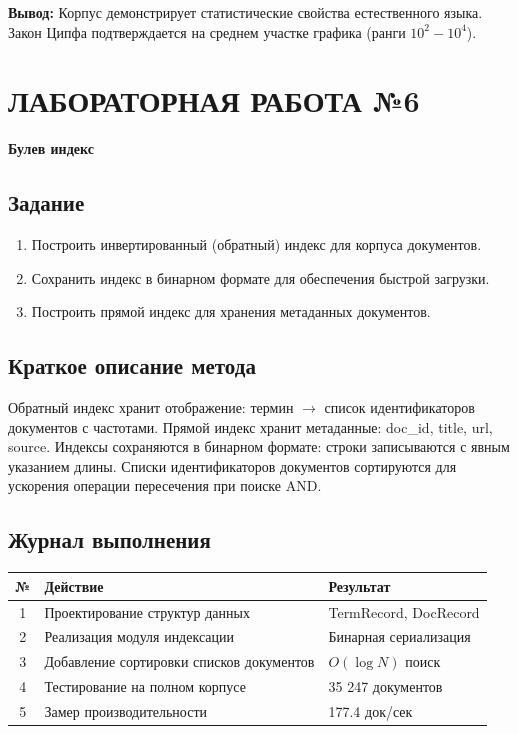 \documentclass[a4paper, 12pt]{article}
\begin{document}
\textbf{Вывод:} Корпус демонстрирует статистические свойства естественного языка. Закон Ципфа подтверждается на среднем участке графика (ранги $10^2 - 10^4$).

\newpage

\section*{ЛАБОРАТОРНАЯ РАБОТА №6}
\textbf{Булев индекс}

\subsection*{Задание}
\begin{enumerate}
    \item Построить инвертированный (обратный) индекс для корпуса документов.
    \item Сохранить индекс в бинарном формате для обеспечения быстрой загрузки.
    \item Построить прямой индекс для хранения метаданных документов.
\end{enumerate}

\subsection*{Краткое описание метода}
Обратный индекс хранит отображение: термин $\rightarrow$ список идентификаторов документов с частотами. Прямой индекс хранит метаданные: doc\_id, title, url, source. Индексы сохраняются в бинарном формате: строки записываются с явным указанием длины. Списки идентификаторов документов сортируются для ускорения операции пересечения при поиске AND.

\subsection*{Журнал выполнения}
\begin{table}[h]
\centering
\begin{tabular}{|c|l|l|}
\hline
\textbf{№} & \textbf{Действие} & \textbf{Результат} \\ \hline
1 & Проектирование структур данных & TermRecord, DocRecord \\ \hline
2 & Реализация модуля индексации & Бинарная сериализация \\ \hline
3 & Добавление сортировки списков документов & $O(\log N)$ поиск \\ \hline
4 & Тестирование на полном корпусе & 35 247 документов \\ \hline
5 & Замер производительности & 177.4 док/сек \\ \hline
\end{tabular}
\end{table}
\end{document}
